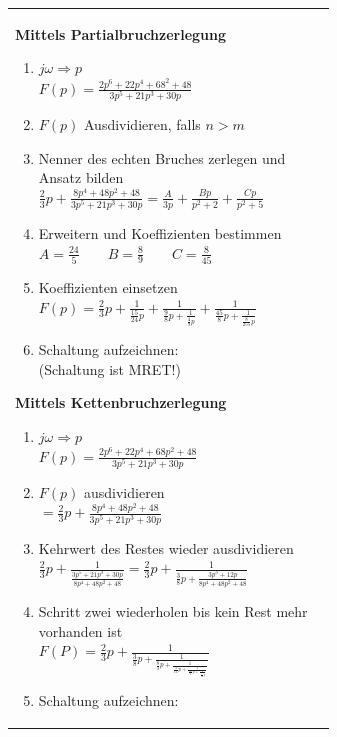 	\begin{tabular}{ll}
    	\parbox{9cm}{
			\textbf{Mittels Partialbruchzerlegung}
				\begin{enumerate}{\setlength{\itemsep}{0cm}\setlength{\parsep}{0cm} \setlength{\topsep}{0cm}}
		          \item $j\omega \Rightarrow p$\\
		          $F(p)=\frac{2p^6+22p^4+68^2+48}{3p^5+21p^3+30p}$
		          \item $F(p)$ Ausdividieren, falls $n>m$
		          \item Nenner des echten Bruches zerlegen und \\
		          Ansatz bilden\\
		          $\frac{2}{3}p+\frac{8p^4+48p^2+48}{3p^5+21p^3+30p}=\frac{A}{3p}+\frac{Bp}{p^2+2}+\frac{Cp}{p^2+5}$
		          \item Erweitern und Koeffizienten bestimmen\\
		          $A=\frac{24}{5} \qquad B=\frac{8}{9} \qquad C=\frac{8}{45}$
		          \item Koeffizienten einsetzen\\
		          $F(p)=\frac{2}{3}p+\frac{1}{\frac{15}{24}p}+\frac{1}{\frac{9}{8}p+\frac{1}{\frac{4}{9}p}}+\frac{1}{\frac{45}{8}p+\frac{1}{\frac{8}{255}p}}$
		          \item Schaltung aufzeichnen:\\
		          (Schaltung ist MRET!)
                \end{enumerate}
        }
    	\parbox{9cm}{
			\textbf{Mittels Kettenbruchzerlegung}
				\begin{enumerate}{\setlength{\itemsep}{0cm}\setlength{\parsep}{0cm} \setlength{\topsep}{0cm}}
                  \item $j\omega \Rightarrow p$\\
                  $F(p)=\frac{2p^6+22p^4+68p^2+48}{3p^5+21p^3+30p}$
		          \item $F(p)$ ausdividieren\\
		          $=\frac{2}{3}p+\frac{8p^4+48p^2+48}{3p^5+21p^3+30p}$
		          \item Kehrwert des Restes wieder ausdividieren\\
		          $\frac{2}{3}p+\frac{1}{\frac{3p^5+21p^3+30p}{8p^4+48p^2+48}}=\frac{2}{3}p+\frac{1}{\frac{3}{8}p+\frac{3p^3+12p}{8p^4+48p^2+48}}$
		          \item Schritt zwei wiederholen bis kein Rest mehr\\
		          vorhanden ist\\
		          $F(P)=\frac{2}{3}p+\frac{1}{\frac{3}{8}p+\frac{1}{\frac{8}{3}p+\frac{1}{\frac{3}{16}p+\frac{1}{\frac{16}{3}p+\frac{1}{\frac{1}{16}p}}}}}$
		          \item Schaltung aufzeichnen:
                \end{enumerate}
         }
	\end{tabular}\\


